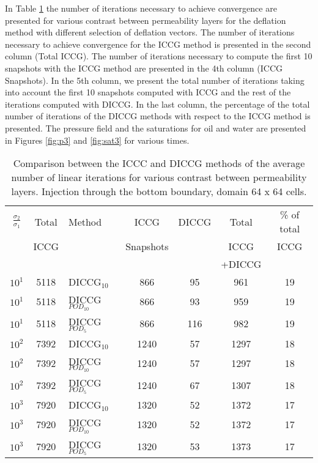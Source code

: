 \documentclass[12pt]{article}
\begin{document}
In Table \ref{table:liter3} the number of iterations necessary to achieve convergence are presented for various contrast between permeability layers for the deflation method with different selection of deflation vectors. The number of iterations necessary to achieve convergence for the ICCG method is presented in the second column (Total ICCG). The number of iterations necessary to compute the first 10 snapshots with the ICCG method are presented in the 4th column (ICCG Snapshots). In the 5th column, we present the total number of iterations taking into account the first 10 snapshots computed with ICCG and the rest of the iterations computed with DICCG. In the last column, the percentage of the total number of iterations of the DICCG methods with respect to the ICCG method is presented.   
The pressure field and the saturations for oil and water are presented in Figures \ref{fig:p3} and \ref{fig:sat3} for various times.
\begin{table}[!h]\centering
\begin{minipage}{1\textwidth}
 \centering
\begin{tabular}{ ||c|c||l|c|c|c|c||} 
\hline
$\frac{\sigma_2}{\sigma_1}$&Total&Method  & ICCG&DICCG &Total&\% of total\\ 
                           & ICCG     &  & Snapshots& &ICCG& ICCG\\ 
                            &     &  & & &+DICCG& \\
\hline 
$10^{1}$ &5118& DICCG$_{10}$&866&95&961&19\\ 
\hline  
$10^{1}$ &5118& DICCG$_{POD_{10}}$&866&93&959&19 \\ 
\hline  
$10^{1}$ &5118& DICCG$_{POD_{5}}$&866&116&982&19 \\ 
\hline 
$10^{2}$ &7392& DICCG$_{10}$&1240&57&1297&18\\ 
\hline  
$10^{2}$ &7392& DICCG$_{POD_{10}}$&1240&57&1297&18 \\ 
\hline  
$10^{2}$ &7392& DICCG$_{POD_{5}}$&1240&67&1307&18 \\ 
\hline 
$10^{3}$ &7920& DICCG$_{10}$&1320&52&1372&17\\ 
\hline  
$10^{3}$ &7920& DICCG$_{POD_{10}}$&1320&52&1372&17 \\ 
\hline  
$10^{3}$ &7920& DICCG$_{POD_{5}}$&1320&53&1373&17 \\ 
\hline  
\end{tabular} 
\caption{Comparison between the ICCC and DICCG methods of the average number of linear iterations for various contrast between permeability layers. Injection through the bottom boundary, domain 64 x 64 cells.}\label{table:liter3} 
\end{minipage}  
\end{table}  
\end{document}
